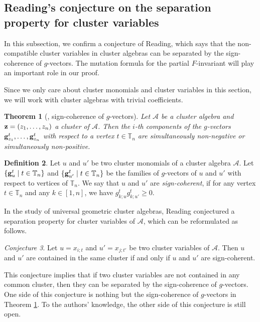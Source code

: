 \documentclass[12pt]{amsart}
\newtheorem{theorem}{Theorem}[section]
\theoremstyle{definition}
\newtheorem{definition}[theorem]{Definition}
\theoremstyle{remark}
\newtheorem{conjecture}[theorem]{Conjecture}
\numberwithin{equation}{section}
\begin{document}
\subsection{Reading's conjecture on the separation property for cluster variables} In this subsection, we confirm a conjecture of Reading, which says that the non-compatible cluster variables in cluster algebras can be separated by the sign-coherence of $g$-vectors. The mutation formula for the partial $F$-invariant will play an important role in our proof. 


Since we only care about cluster monomials and cluster variables in this section, we will work with cluster algebras with trivial coefficients.

\begin{theorem}[{\cite{GHKK18}, sign-coherence of $g$-vectors}] \label{thm:GHKK}
Let $\mathcal A$ be a cluster algebra and ${\bf z}=(z_1,\ldots,z_n)$ a cluster of $\mathcal A$. Then the $i$-th components of the $g$-vectors ${\bf g}_{z_1}^{t},\ldots,{\bf g}_{z_n}^{t}$ with respect to a vertex $t\in\mathbb T_n$ are simultaneously
non-negative or simultaneously non-positive.
\end{theorem}


\begin{definition}\label{def:sign-coherent}
Let $u$ and $u'$ be two cluster monomials of a cluster algebra $\mathcal A$. 
    Let $\{{\bf g}_{u}^t\mid t\in\mathbb T_n\}$ and   $\{{\bf g}_{u'}^t\mid t\in\mathbb T_n\}$ be the families of $g$-vectors of $u$ and $u'$ with respect to vertices of $\mathbb T_n$. We say that $u$ and $u'$ are {\em sign-coherent}, if for any vertex $t\in\mathbb T_n$ and any $k\in[1,n]$, we have 
    $g_{k;u}^tg_{k;u'}^t\geq 0$.
\end{definition}
In the study of universal geometric cluster algebras, Reading \cite{Reading-2014} conjectured a separation
property for cluster variables of $\mathcal A$, which can be reformulated as follows.
\begin{conjecture}\cite[Conjecture 8.21]{Reading-2014} \label{conj:reading}
Let $u=x_{i;t}$ and $u'=x_{j;t'}$ be two cluster variables of $\mathcal A$. Then $u$ and $u'$ are contained in the same cluster if and only if $u$ and $u'$ are sign-coherent.   
\end{conjecture}
This conjecture implies that if two cluster variables are not contained in any common cluster, then they can be separated by the sign-coherence of $g$-vectors. One side of this conjecture is nothing but the sign-coherence of $g$-vectors in Theorem \ref{thm:GHKK}. To the authors' knowledge, the other side of this conjecture is still open. 
\end{document}
